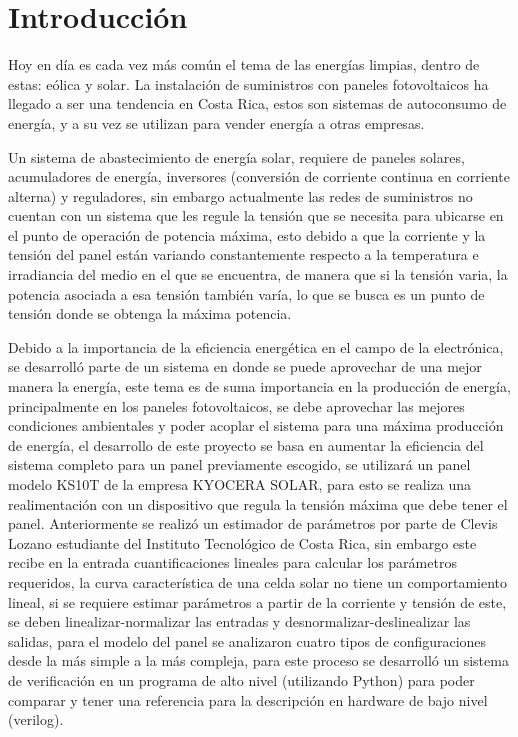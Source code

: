 
\chapter{Introducción}
\label{chp:intro}

Hoy en día es cada vez más común el tema de las energías limpias, dentro de estas: eólica y solar. La instalación de suministros con paneles fotovoltaicos ha llegado a ser una tendencia en Costa Rica, estos son sistemas de autoconsumo de energía, y a su vez se utilizan para vender energía a otras empresas. 

Un sistema de abastecimiento de energía solar, requiere de paneles solares, acumuladores de energía, inversores (conversión de corriente continua en corriente alterna) y reguladores, sin embargo actualmente las redes de suministros no cuentan con un sistema que les regule la tensión que se necesita para ubicarse en el punto de operación de potencia máxima, esto debido a que la corriente y la tensión del panel están variando constantemente respecto a la temperatura e irradiancia del medio en el que se encuentra, de manera que si la tensión varia, la potencia asociada a esa tensión también varía, lo que se busca es un punto de tensión donde se obtenga la máxima potencia.
 
Debido a la importancia de la eficiencia energética en el campo de la electrónica, se desarrolló parte de un sistema en donde se puede aprovechar de una mejor manera la energía, este tema es de suma importancia en la producción de energía, principalmente en los paneles fotovoltaicos, se debe aprovechar las mejores condiciones ambientales y poder acoplar el sistema para una máxima producción de energía, el desarrollo de este proyecto se basa en aumentar la eficiencia del sistema completo para un panel previamente escogido, se utilizará un panel modelo KS10T de la empresa KYOCERA SOLAR, para esto se realiza una realimentación con un dispositivo que regula la tensión máxima que debe tener el panel. Anteriormente se realizó un estimador de parámetros por parte de Clevis Lozano estudiante del Instituto Tecnológico de Costa Rica, sin embargo este recibe en la entrada cuantificaciones lineales para calcular los parámetros requeridos, la curva característica de una celda solar no tiene un comportamiento lineal, si se requiere estimar parámetros a partir de la corriente y tensión de este, se deben linealizar-normalizar las entradas y desnormalizar-deslinealizar las salidas, para el modelo del panel se analizaron cuatro tipos de configuraciones desde la más simple a la más compleja, para este proceso se desarrolló un sistema de verificación en un programa de alto nivel (utilizando Python) para poder comparar y tener una referencia para la descripción en hardware de bajo nivel (verilog). 

